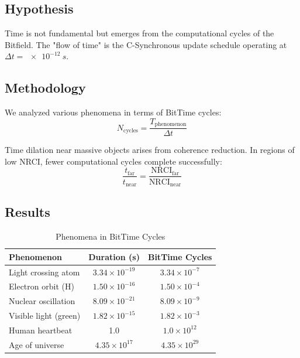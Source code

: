 \documentclass[12pt,a4paper]{article}
\begin{document}
\subsection{Hypothesis}

Time is not fundamental but emerges from the computational cycles of the Bitfield. The "flow of time" is the C-Synchronous update schedule operating at $\Delta t = \SI{e-12}{s}$.

\subsection{Methodology}

We analyzed various phenomena in terms of BitTime cycles:
\begin{equation}
N_{\text{cycles}} = \frac{T_{\text{phenomenon}}}{\Delta t}
\end{equation}

Time dilation near massive objects arises from coherence reduction. In regions of low NRCI, fewer computational cycles complete successfully:
\begin{equation}
\frac{t_{\text{far}}}{t_{\text{near}}} = \frac{\text{NRCI}_{\text{far}}}{\text{NRCI}_{\text{near}}}
\end{equation}

\subsection{Results}

\begin{table}[h]
\centering
\caption{Phenomena in BitTime Cycles}
\begin{tabular}{lcc}
\toprule
\textbf{Phenomenon} & \textbf{Duration (s)} & \textbf{BitTime Cycles} \\
\midrule
Light crossing atom & $3.34 \times 10^{-19}$ & $3.34 \times 10^{-7}$ \\
Electron orbit (H) & $1.50 \times 10^{-16}$ & $1.50 \times 10^{-4}$ \\
Nuclear oscillation & $8.09 \times 10^{-21}$ & $8.09 \times 10^{-9}$ \\
Visible light (green) & $1.82 \times 10^{-15}$ & $1.82 \times 10^{-3}$ \\
Human heartbeat & 1.0 & $1.0 \times 10^{12}$ \\
Age of universe & $4.35 \times 10^{17}$ & $4.35 \times 10^{29}$ \\
\bottomrule
\end{tabular}
\label{tab:bittime}
\end{table}
\end{document}
